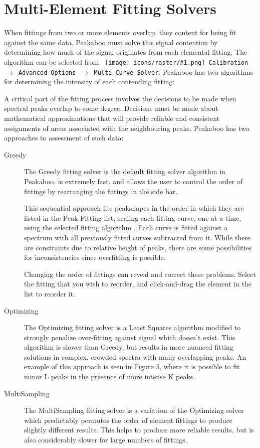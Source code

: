 \documentclass[article,twoside,11pt]{report}
\newcommand{\command}[1]{\texttt{#1}}
\newcommand{\icon}[1]{\texttt{[image: icons/raster/\#1.png]}}
\newcommand{\button}[2]{\ \command{\icon{#1} #2}}
\newcommand{\menu}[0]{$\rightarrow$}
\newcommand{\tocsection}[1]{\section*{#1}\addcontentsline{toc}{section}{#1}}
\begin{document}
\tocsection{Multi-Element Fitting Solvers}

When fittings from two or more elements overlap, they content for being fit against the same data. Peakaboo must solve this signal contention by determining how much of the signal originates from each elemental fitting. The algorithm can be selected from \command{\button{energy-menu}{Calibration} \menu\ Advanced Options \menu\ Multi-Curve Solver}. Peakaboo has two algorithms for determining the intensity of each contending fitting:

A critical part of the fitting process involves the decisions to be made when spectral peaks overlap to some degree. Decisions must be made about mathematical approximations that will provide reliable and consistent assignments of areas associated with the neighbouring peaks. Peakaboo has two approaches to assessment of such data: 





\begin{description}

\item [Greedy] The Greedy fitting solver is the default fitting solver algorithm in Peakaboo. is extremely fast, and allows the user to control the order of fittings by rearranging the fittings in the side bar. 

This sequential approach fits peakshapes in the order in which they are listed in the Peak Fitting list, scaling each fitting curve, one at a time, using the selected fitting algorithm . Each curve is fitted against a spectrum with all previously fitted curves subtracted from it. While there are constraints due to relative height of peaks, there are some possibilities for inconsistencies since overfitting is possible. 

Changing the order of fittings can reveal and correct these problems. Select the fitting that you wish to reorder, and click-and-drag the element in the list to reorder it.


\item [Optimizing] The Optimizing fitting solver is a Least Squares algorithm modified to strongly penalize over-fitting against signal which doesn't exist. This algorithm is slower than Greedy, but results in more nuanced fitting solutions in complex, crowded spectra with many overlapping peaks. An example of this approach is seen in Figure 5, where it is possible to fit minor L peaks in the presence of more intense K peaks.

\item [MultiSampling] The MultiSampling fitting solver is a variation of the Optimizing solver which predictably permutes the order of element fittings to produce slightly different results. This helps to produce more reliable results, but is also considerably slower for large numbers of fittings.

\end{description}
\end{document}
